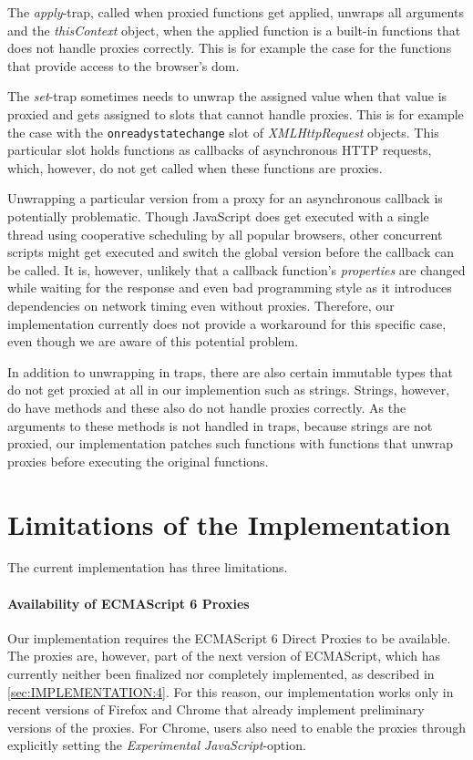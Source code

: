 The \emph{apply}-trap, called when proxied functions get applied, unwraps all arguments and the \emph{thisContext} object, when the applied function is a built-in functions that does not handle proxies correctly.
This is for example the case for the functions that provide access to the browser's \ac{dom}.

The \emph{set}-trap sometimes needs to unwrap the assigned value when that value is proxied and gets assigned to slots that cannot handle proxies.
This is for example the case with the \lstinline{onreadystatechange} slot of \emph{XMLHttpRequest} objects.
This particular slot holds functions as callbacks of asynchronous HTTP requests, which, however, do not get called when these functions are proxies.

Unwrapping a particular version from a proxy for an asynchronous callback is potentially problematic.
Though JavaScript does get executed with a single thread using cooperative scheduling by all popular browsers, other concurrent scripts might get executed and switch the global version before the callback can be called.
It is, however, unlikely that a callback function's \emph{properties} are changed while waiting for the response and even bad programming style as it introduces dependencies on network timing even without proxies.
Therefore, our implementation currently does not provide a workaround for this specific case, even though we are aware of this potential problem. 

In addition to unwrapping in traps, there are also certain immutable types that do not get proxied at all in our implemention such as strings.
Strings, however, do have methods and these also do not handle proxies correctly.
As the arguments to these methods is not handled in traps, because strings are not proxied, our implementation patches such functions with functions that unwrap proxies before executing the original functions.







\section{Limitations of the Implementation}

The current implementation has three limitations.

\paragraph{Availability of ECMAScript 6 Proxies}
Our implementation requires the ECMAScript 6 Direct Proxies to be available.
The proxies are, however, part of the next version of ECMAScript, which has currently neither been finalized nor completely implemented, as described in \ref{sec:IMPLEMENTATION:4}.
For this reason, our implementation works only in recent versions of Firefox and Chrome that already implement preliminary versions of the proxies.
For Chrome, users also need to enable the proxies through explicitly setting the \emph{Experimental JavaScript}-option.

